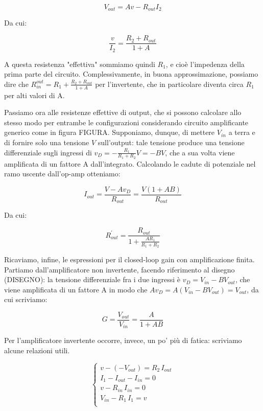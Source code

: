 \documentclass[journal, a4paper]{IEEEtran}
\begin{document}
\begin{equation}
V_{out} = Av - R_{out}I_2
\end{equation}

Da cui:

\begin{equation}
\frac{v}{I_2} = \frac{R_2 + R_{out}}{1 + A}
\end{equation}

A questa resistenza "effettiva" sommiamo quindi $R_1$, e cioè l'impedenza della prima parte del circuito. Complessivamente, in buona approssimazione, possiamo dire che $R_{in}^{out} = R_1 + \frac{R_2 + R_{out}}{1 + A}$ per l'invertente, che in particolare diventa circa $R_1$ per alti valori di A.

Passiamo ora alle resistenze effettive di output, che si possono calcolare allo stesso modo per entrambe le configurazioni considerando circuito amplificante generico come in figura FIGURA. Supponiamo, dunque, di mettere $V_{in}$ a terra e di fornire solo una tensione $V$ sull'output: tale tensione produce una tensione differenziale sugli ingressi di $v_D = -\frac{R_1}{R_1 + R_2}V = -BV$, che a sua volta viene amplificata di un fattore A dall'integrato. Calcolando le cadute di potenziale nel ramo uscente dall'op-amp otteniamo:

\begin{equation}
I_{out} = \frac{V-Av_D}{R_{out}} = \frac{V(1+AB)}{R_{out}}
\end{equation}

Da cui:

\begin{equation}
R_{out}^{'} = \frac{R_{out}}{1+\frac{AR_1}{R_1 + R_2}}
\end{equation}

Ricaviamo, infine, le espressioni per il closed-loop gain con amplificazione finita. Partiamo dall'amplificatore non invertente, facendo riferimento al disegno (DISEGNO): la tensione differenziale fra i due ingressi è $v_D = V_{in} - BV_{out}$, che viene amplificata di un fattore A in modo che $Av_D = A(V_{in} - BV_{out}) = V_{out}$, da cui scriviamo:

\begin{equation}
G = \frac{V_{out}}{V_{in}} = \frac{A}{1+AB}
\end{equation}

Per l'amplificatore invertente occorre, invece, un po' più di fatica: scriviamo alcune relazioni utili.

\begin{equation}
\begin{cases}
 v - (-V_{out}) = R_2\, I_{out} \\
 I_1 - I_{out} - I_{in} = 0\\
 v - R_{in} \, I_{in} = 0\\
 V_{in} - R_1 \, I_1 = v\\
\end{cases}
\end{equation}
\end{document}
